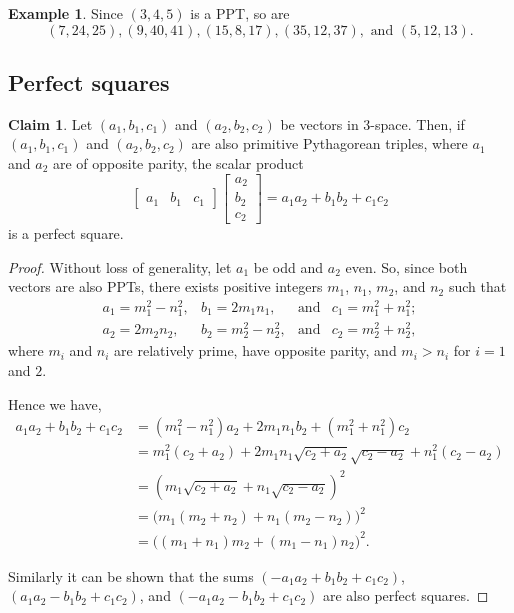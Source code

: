 \documentclass{article}
\theoremstyle{definition}
\newtheorem{claim}{Claim}
\newtheorem{example}{Example}[section]
\begin{document}
\begin{example}
Since \((3,4,5)\) is a PPT, so are
\[ (7,24,25), (9,40,41), (15,8,17), (35,12,37), \text{ and } (5,12,13). \]
\end{example}

\subsection{Perfect squares}

\begin{claim}
Let \((a_1,b_1,c_1)\) and \((a_2,b_2,c_2)\) be vectors in 3-space. Then, if \((a_1,b_1,c_1)\) and \((a_2,b_2,c_2)\) are also primitive Pythagorean triples, where \(a_1\) and \(a_2\) are of opposite parity, the scalar product \[ \begin{bmatrix}a_1 & b_1 & c_1 \end{bmatrix} \begin{bmatrix}a_2 \\ b_2 \\ c_2 \end{bmatrix} = a_1a_2+b_1b_2+c_1c_2 \] is a perfect square.
\end{claim}
\begin{proof}
Without loss of generality, let \(a_1\) be odd and \(a_2\) even. So, since both vectors are also PPTs, there exists positive integers \(m_1\), \(n_1\), \(m_2\), and \(n_2\) such that \[ \begin{array}{llcl}
a_1 = m_1^2 - n_1^2, & b_1 = 2m_1n_1, & \text{and} & c_1 = m_1^2 + n_1^2; \\
a_2 = 2m_2n_2, & b_2 = m_2^2-n_2^2, & \text{and} & c_2 = m_2^2+n_2^2,
\end{array} \]
where \(m_i\) and \(n_i\) are relatively prime, have opposite parity, and \(m_i>n_i\) for \(i=1\) and \(2\).

Hence we have, \[\begin{aligned}
a_1a_2+b_1b_2+c_1c_2 &= (m_1^2-n_1^2)a_2 + 2m_1n_1b_2 + (m_1^2+n_1^2)c_2 \\
&= m_1^2(c_2+a_2) + 2m_1n_1\sqrt{c_2+a_2}\sqrt{c_2-a_2} + n_1^2(c_2-a_2) \\
&= (m_1\sqrt{c_2+a_2} + n_1\sqrt{c_2-a_2})^2 \\
&= \big(m_1(m_2+n_2)+n_1(m_2-n_2)\big)^2 \\
&= \big((m_1+n_1)m_2 + (m_1-n_1)n_2\big)^2.
\end{aligned}\]

Similarly it can be shown that the sums \((-a_1a_2+b_1b_2+c_1c_2)\), \((a_1a_2-b_1b_2+c_1c_2)\), and \((-a_1a_2-b_1b_2+c_1c_2)\) are also perfect squares.
\end{proof}
\end{document}

